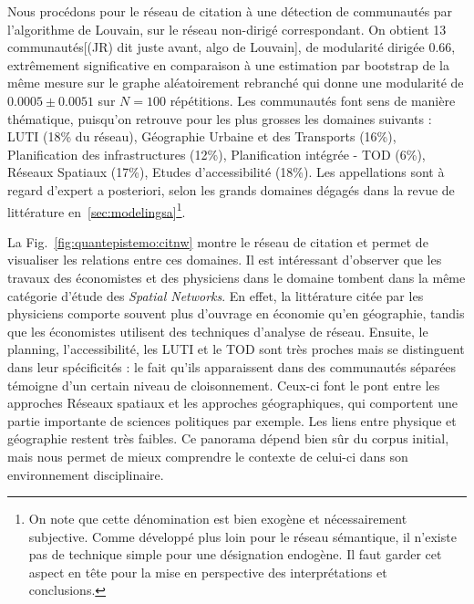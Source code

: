 Nous procédons pour le réseau de citation à une détection de communautés par l'algorithme de Louvain, sur le réseau non-dirigé correspondant. On obtient 13 communautés[(JR) dit juste avant, algo de Louvain], de modularité dirigée 0.66, extrêmement significative en comparaison à une estimation par bootstrap de la même mesure sur le graphe aléatoirement rebranché qui donne une modularité de $0.0005 \pm 0.0051$ sur $N=100$ répétitions. Les communautés font sens de manière thématique, puisqu'on retrouve pour les plus grosses les domaines suivants : LUTI (18\% du réseau), Géographie Urbaine et des Transports (16\%), Planification des infrastructures (12\%), Planification intégrée - TOD (6\%), Réseaux Spatiaux (17\%), Etudes d'accessibilité (18\%). Les appellations sont à regard d'expert a posteriori, selon les grands domaines dégagés dans la revue de littérature en~\ref{sec:modelingsa}\footnote{On note que cette dénomination est bien exogène et nécessairement subjective. Comme développé plus loin pour le réseau sémantique, il n'existe pas de technique simple pour une désignation endogène. Il faut garder cet aspect en tête pour la mise en perspective des interprétations et conclusions.}.


La Fig.~\ref{fig:quantepistemo:citnw} montre le réseau de citation et permet de visualiser les relations entre ces domaines. Il est intéressant d'observer que les travaux des économistes et des physiciens dans le domaine tombent dans la même catégorie d'étude des \emph{Spatial Networks}. En effet, la littérature citée par les physiciens comporte souvent plus d'ouvrage en économie qu'en géographie, tandis que les économistes utilisent des techniques d'analyse de réseau. Ensuite, le planning, l'accessibilité, les LUTI et le TOD sont très proches mais se distinguent dans leur spécificités : le fait qu'ils apparaissent dans des communautés séparées témoigne d'un certain niveau de cloisonnement. Ceux-ci font le pont entre les approches Réseaux spatiaux et les approches géographiques, qui comportent une partie importante de sciences politiques par exemple. Les liens entre physique et géographie restent très faibles. Ce panorama dépend bien sûr du corpus initial, mais nous permet de mieux comprendre le contexte de celui-ci dans son environnement disciplinaire.


